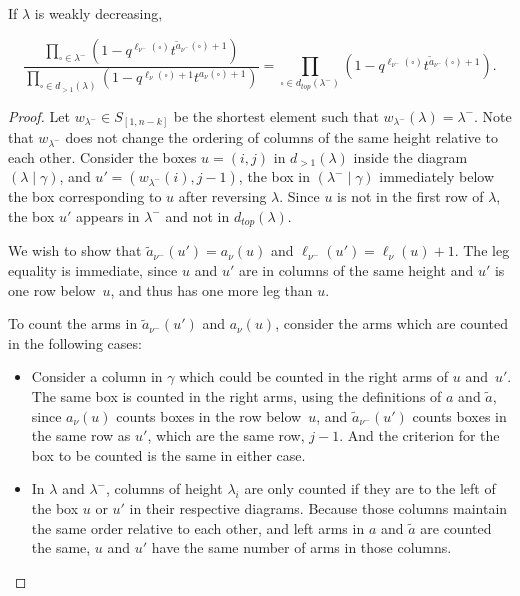 \documentclass[ALCO]{cedram}
\newcommand{\Sn}{S_{[1,n-k]}}
\newcommand{\numin}{{\nu^-}}
\newcommand{\nudom}{{( \lambda \mid \gamma )}}
\newcommand{\nuantidom}{{(\lambda^- \mid \gamma)}}
\newcommand{\legnu}{{\ell_\nu(\square)}}
\newcommand{\legnumin}{{\ell_{\nu^-}(\square)}}
\newcommand{\armonenumin}{{\widetilde{a}_{\nu^-}(\square)}}
\newcommand{\armtwonu}{{a_\nu(\square)}}
\newcommand{\symmetricprod}{\prod\limits_{\square \in \lambda^-}}
\begin{document}
\begin{lemm}\label{lambdalemma} If $\lambda$ is weakly decreasing,

\begin{equation}\label{lambdaequality}\frac{\symmetricprod (1-q^{\legnumin}t^{\armonenumin + 1}) }{  \prod\limits_{\square \in d_{>1}(\lambda)} \left(1-q^{\legnu+1}t^{\armtwonu +1} \right)  } = \prod\limits_{\square \in d_{top}(\lambda^-)} (1-q^\legnumin t^{\armonenumin + 1}).\end{equation}\end{lemm}

\begin{proof}
Let $w_{\lambda^-}\in \Sn$ be the shortest element such that $w_{\lambda^-}(\lambda)=\lambda^-$. Note that $w_{\lambda^-}$ does not change the ordering of columns of the same height relative to each other. Consider the boxes $u=(i,j)$ in $d_{>1}(\lambda)$ inside the diagram $\nudom$, and $u'=(w_{\lambda^-}(i),j-1)$, the box in $\nuantidom$ immediately below the box corresponding to $u$ after reversing $\lambda$. Since $u$ is not in the first row of $\lambda$, the box $u'$ appears in $\lambda^-$ and not in $d_{top}(\lambda)$.

We wish to show that $\widetilde{a}_\numin(u')=a_\nu(u)$ and $\ell_{\numin}(u')=\ell_\nu(u)+1$. The leg equality is immediate, since $u$ and $u'$ are in columns of the same height and $u'$ is one row below~$u$, and thus has one more leg than $u$.

To count the arms in $\widetilde{a}_\numin(u')$ and $a_\nu(u)$, consider the arms which are counted in the following cases:

\begin{itemize} \item Consider a column in $\gamma$ which could be counted in the right arms of $u$ and~$u'$. The same box is counted in the right arms, using the definitions of $a$ and $\widetilde{a}$, since $a_\nu(u)$ counts boxes in the row below~$u$, and $\widetilde{a}_\numin(u')$ counts boxes in the same row as $u'$, which are the same row, $j-1$. And the criterion for the box to be counted is the same in either case.

\item In $\lambda$ and $\lambda^-$, columns of height $\lambda_i$ are only counted if they are to the left of the box $u$ or $u'$ in their respective diagrams. Because those columns maintain the same order relative to each other, and left arms in $a$ and $\widetilde{a}$ are counted the same, $u$ and $u'$ have the same number of arms in those columns. 


\end{itemize}
\end{proof}
\end{document}
